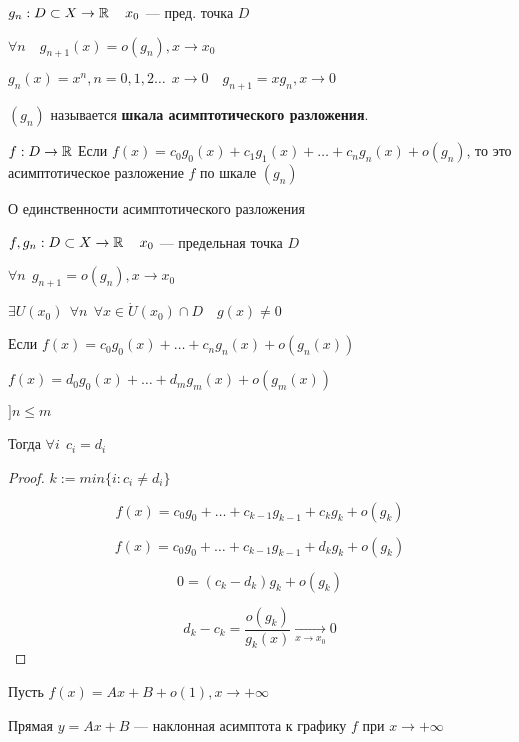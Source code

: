     \begin{definition}
        $g_n:D\subset X\to\operatorname*{\mathbb{R}} \quad x_0$ --- пред. точка $D$

        $\forall n \quad g_{n+1}(x)=o(g_n), x\to x_0$

        \begin{example}
            $g_n(x)=x^n, n=0,1,2\ldots \ \ x\to 0 \quad g_{n+1}=xg_n, x\to 0$
        \end{example}

        $(g_n)$ называется \textbf{шкала асимптотического разложения}.
        
        $f:D\to\operatorname*{\mathbb{R}}$ Если $f(x)=c_0g_0(x)+c_1g_1(x)+\ldots+c_ng_n(x)+o(g_n)$, то это асимптотическое разложение $f$ по шкале $(g_n)$
    \end{definition}
    \begin{theorem}
        О единственности асимптотического разложения

        $f, g_n: D\subset X\to \operatorname*{\mathbb{R}} \quad x_0$ --- предельная точка $D$

        $\forall n \ \ g_{n+1}=o(g_n), x\to x_0$

        $\exists U(x_0) \ \ \forall n \ \ \forall x\in\dot U(x_0)\cap D \quad g(x)\not=0$

        Если $f(x)=c_0g_0(x)+\ldots+c_ng_n(x)+o(g_n(x))$

        $f(x)=d_0g_0(x)+\ldots+d_mg_m(x)+o(g_m(x))$

        $] n\leq m$

        Тогда $\forall i \ \ c_i=d_i$
    \end{theorem}
    \begin{proof}
        $k:=min\{i:c_i\not=d_i\}$

        $$f(x)=c_0g_0+\ldots+c_{k-1}g_{k-1}+c_kg_k+o(g_k)$$

        $$f(x)=c_0g_0+\ldots+c_{k-1}g_{k-1}+d_kg_k+o(g_k)$$

        $$0=(c_k-d_k)g_k+o(g_k)$$

        $$d_k-c_k=\frac{o(g_k)}{g_k(x)}\xrightarrow[x\to x_0]{}0$$
    \end{proof}
    \begin{example}
        Пусть $f(x)=Ax+B+o(1), x\to +\infty$

        Прямая $y=Ax+B$ --- наклонная асимптота к графику $f$ при $x\to +\infty$
    \end{example}
